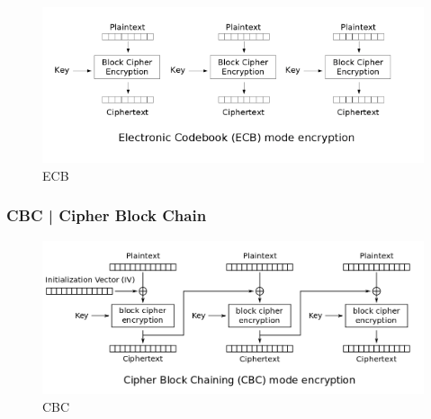 \textsf{\small }

\begin{figure}[H]
	\centering
	\includegraphics[width=.9\textwidth, height=.9\textheight, keepaspectratio]{./images/aes_modes/ecb_encryption.png} %
	\caption{ECB}
	\label{fig:ecb}
\end{figure}

\subsubsection{CBC | Cipher Block Chain}


\textsf{\small }

\begin{figure}[H]
	\centering
	\includegraphics[width=1\textwidth, height=1\textheight, keepaspectratio]{./images/aes_modes/cbc.png} %
	\caption{CBC}
	\label{fig:cbc}
\end{figure}


